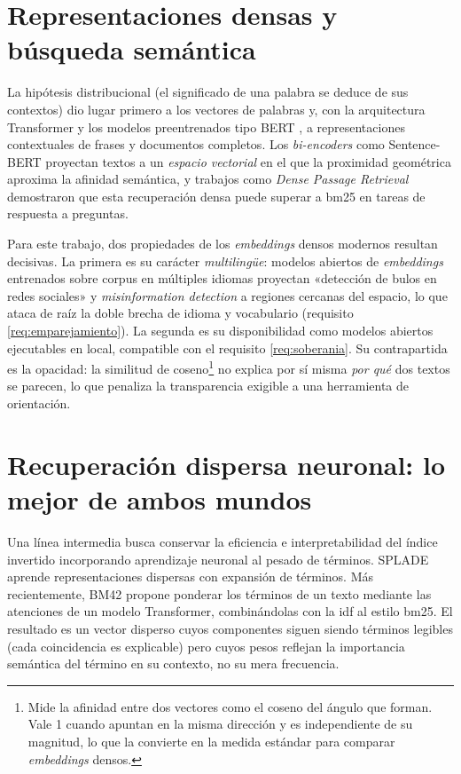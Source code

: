 \section{Representaciones densas y búsqueda semántica}
\label{sec:sota-densa}

La hipótesis distribucional (el significado de una palabra se deduce de sus contextos) dio lugar primero a los vectores de palabras \citep{mikolov2013word2vec} y, con la arquitectura Transformer \citep{vaswani2017attention} y los modelos preentrenados tipo BERT \citep{devlin2019bert}, a representaciones contextuales de frases y documentos completos.
Los \emph{bi-encoders} como Sentence-BERT \citep{reimers2019sbert} proyectan textos a un \emph{espacio vectorial} en el que la proximidad geométrica aproxima la afinidad semántica, y trabajos como \emph{Dense Passage Retrieval} \citep{karpukhin2020dpr} demostraron que esta recuperación densa puede superar a \gls{bm25} en tareas de respuesta a preguntas.

Para este trabajo, dos propiedades de los \emph{embeddings} densos modernos resultan decisivas.
La primera es su carácter \emph{multilingüe}: modelos abiertos de \emph{embeddings} entrenados sobre corpus en múltiples idiomas \citep{nussbaum2025nomic} proyectan «detección de bulos en redes sociales» y \emph{misinformation detection} a regiones cercanas del espacio, lo que ataca de raíz la doble brecha de idioma y vocabulario (requisito \ref{req:emparejamiento}).
La segunda es su disponibilidad como modelos abiertos ejecutables en local, compatible con el requisito \ref{req:soberania}.
Su contrapartida es la opacidad: la similitud de coseno\footnote{Mide la afinidad entre dos vectores como el coseno del ángulo que forman. Vale 1 cuando apuntan en la misma dirección y es independiente de su magnitud, lo que la convierte en la medida estándar para comparar \emph{embeddings} densos.} no explica por sí misma \emph{por qué} dos textos se parecen, lo que penaliza la transparencia exigible a una herramienta de orientación.

\section{Recuperación dispersa neuronal: lo mejor de ambos mundos}
\label{sec:sota-dispersa}

Una línea intermedia busca conservar la eficiencia e interpretabilidad del índice invertido incorporando aprendizaje neuronal al pesado de términos.
SPLADE \citep{formal2021splade} aprende representaciones dispersas con expansión de términos. Más recientemente, BM42 \citep{vasnetsov2024bm42} propone ponderar los términos de un texto mediante las atenciones de un modelo Transformer, combinándolas con la \gls{idf} al estilo \gls{bm25}.
El resultado es un vector disperso cuyos componentes siguen siendo términos legibles (cada coincidencia es explicable) pero cuyos pesos reflejan la importancia semántica del término en su contexto, no su mera frecuencia.

